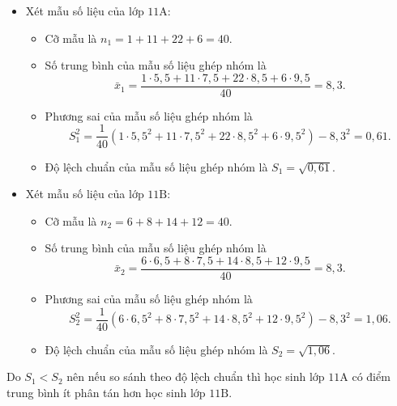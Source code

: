 \begin{vd}
{\begin{enumEX}{1}
\begin{itemize}
				\item Xét mẫu số liệu của lớp $ 11\mathrm{A} $:
				      \begin{itemize}
					      \item Cỡ mẫu là $n_1=1+11+22+6=40$.
					      \item Số trung bình của mẫu số liệu ghép nhóm là
					            $$\bar{x}_1=\dfrac{1 \cdot 5,5+11 \cdot 7,5+22 \cdot 8,5+6 \cdot 9,5}{40}=8,3.$$
					      \item Phương sai của mẫu số liệu ghép nhóm là
					            $$S_1^2=\dfrac{1}{40}\left(1 \cdot 5,5^2+11 \cdot 7,5^2+22 \cdot 8,5^2+6 \cdot 9,5^2\right)-8,3^2=0,61.$$
					      \item Độ lệch chuẩn của mẫu số liệu ghép nhóm là $S_1=\sqrt{0,61}$.
				      \end{itemize}
				\item Xét mẫu số liệu của lớp $ 11\mathrm{B} $:
				      \begin{itemize}
					      \item Cỡ mẫu là $n_2=6+8+14+12=40$.
					      \item Số trung bình của mẫu số liệu ghép nhóm là
					            $$
						            \bar{x}_2=\dfrac{6 \cdot 6,5+8 \cdot 7,5+14 \cdot 8,5+12 \cdot 9,5}{40}=8,3.
					            $$
					      \item Phương sai của mẫu số liệu ghép nhóm là
					            $$
						            S_2^2=\dfrac{1}{40}\left(6 \cdot 6,5^2+8 \cdot 7,5^2+14 \cdot 8,5^2+12 \cdot 9,5^2\right)-8,3^2=1,06.
					            $$
					      \item Độ lệch chuẩn của mẫu số liệu ghép nhóm là $S_2=\sqrt{1,06}$.
				      \end{itemize}
			\end{itemize}
			Do $S_1<S_2$ nên nếu so sánh theo độ lệch chuẩn thì học sinh lớp $11 \mathrm{A}$ có điểm trung bình ít phân tán hơn học sinh lớp $ 11\mathrm{B} $.
		\end{enumEX}
	}
\end{vd}
